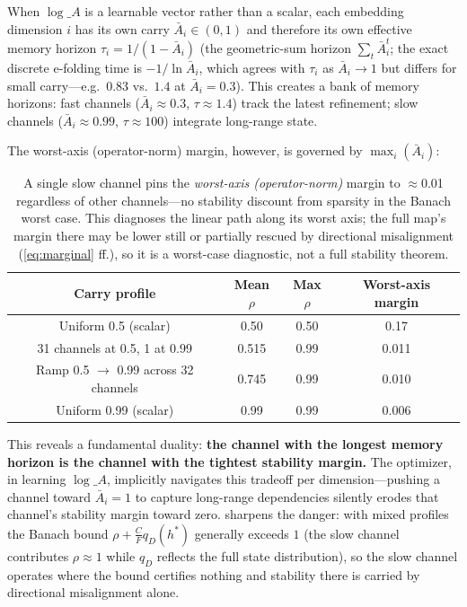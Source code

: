 \documentclass[11pt]{article}
\begin{document}
When $\log\_A$ is a learnable vector rather than a scalar, each embedding dimension $i$ has its own carry $\bar{A}_i \in (0,1)$ and therefore its own effective memory horizon $\tau_i = 1/(1-\bar{A}_i)$ (the geometric-sum horizon $\sum_t \bar{A}_i^t$; the exact discrete e-folding time is $-1/\ln \bar{A}_i$, which agrees with $\tau_i$ as $\bar{A}_i \to 1$ but differs for small carry---e.g.\ $0.83$ vs.\ $1.4$ at $\bar{A}_i = 0.3$). This creates a bank of memory horizons: fast channels ($\bar{A}_i \approx 0.3$, $\tau \approx 1.4$) track the latest refinement; slow channels ($\bar{A}_i \approx 0.99$, $\tau \approx 100$) integrate long-range state.

The worst-axis (operator-norm) margin, however, is governed by $\max_i(\bar{A}_i)$:

\begin{table}[ht]
\centering
\begin{tabular}{@{}cccc@{}}
\toprule
Carry profile & Mean $\rho$ & Max $\rho$ & Worst-axis margin \\
\midrule
Uniform 0.5 (scalar) & 0.50 & 0.50 & 0.17 \\
31 channels at 0.5, 1 at 0.99 & 0.515 & 0.99 & 0.011 \\
Ramp 0.5 $\to$ 0.99 across 32 channels & 0.745 & 0.99 & 0.010 \\
Uniform 0.99 (scalar) & 0.99 & 0.99 & 0.006 \\
\bottomrule
\end{tabular}
\caption{A single slow channel pins the \emph{worst-axis (operator-norm)} margin to $\approx$0.01 regardless of other channels---no stability discount from sparsity in the Banach worst case. This diagnoses the linear path along its worst axis; the full map's margin there may be lower still or partially rescued by directional misalignment (\cref{eq:marginal} ff.), so it is a worst-case diagnostic, not a full stability theorem.}
\label{tab:per-channel}
\end{table}

This reveals a fundamental duality: \textbf{the channel with the longest memory horizon is the channel with the tightest stability margin.} The optimizer, in learning $\log\_A$, implicitly navigates this tradeoff per dimension---pushing a channel toward $\bar{A}_i = 1$ to capture long-range dependencies silently erodes that channel's stability margin toward zero.  sharpens the danger: with mixed profiles the Banach bound $\rho + \tfrac{C}{F}q_D(h^*)$ generally exceeds $1$ (the slow channel contributes $\rho \approx 1$ while $q_D$ reflects the full state distribution), so the slow channel operates where the bound certifies nothing and stability there is carried by directional misalignment alone.
\end{document}
